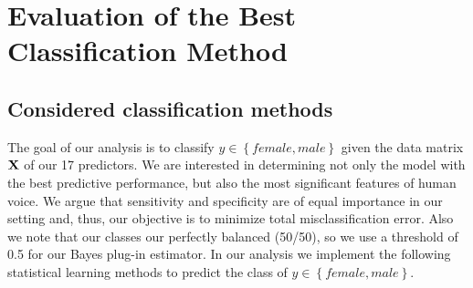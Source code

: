 \chapter{Evaluation of the Best Classification Method}
\label{chapter_classification}
\section{Considered classification methods}
\label{sec_considered_classif}
The goal of our analysis is to classify $y \in \left\lbrace female, male \right\rbrace $ given the data matrix $\mathbf{X}$ of our 17 predictors. 
We are interested in determining not only the model with the best predictive performance, but also the most significant features of human voice. 
We argue that sensitivity and specificity are of equal importance in our setting and, thus, our objective is to minimize total misclassification error. 
Also we note that our classes our perfectly balanced (50/50), so we use a threshold of 0.5 for our Bayes plug-in estimator.
In our analysis we implement the following statistical learning methods to predict the class of $ y \in \left\lbrace female, male \right\rbrace$.
